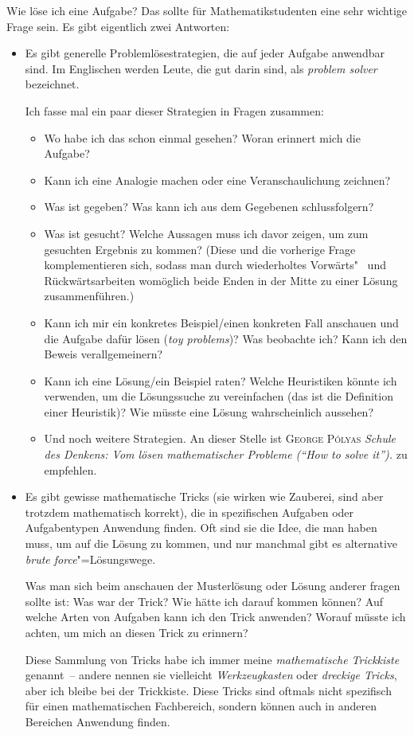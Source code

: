 \documentclass[a4paper]{article}
\begin{document}
Wie löse ich eine Aufgabe? Das sollte für Mathematikstudenten eine sehr wichtige Frage sein. Es gibt eigentlich zwei Antworten:
\begin{itemize}
    \item Es gibt generelle Problemlösestrategien, die auf jeder Aufgabe anwendbar sind. Im Englischen werden Leute, die gut darin sind, als \emph{problem solver} bezeichnet.

          Ich fasse mal ein paar dieser Strategien in Fragen zusammen:
          \begin{itemize}
              \item Wo habe ich das schon einmal gesehen? Woran erinnert mich die Aufgabe?
              \item Kann ich eine Analogie machen oder eine Veranschaulichung zeichnen?
              \item Was ist gegeben? Was kann ich aus dem Gegebenen schlussfolgern?
              \item Was ist gesucht? Welche Aussagen muss ich davor zeigen, um zum gesuchten Ergebnis zu kommen? (Diese und die vorherige Frage komplementieren sich, sodass man durch wiederholtes Vorwärts"~ und Rückwärtsarbeiten womöglich beide Enden in der Mitte zu einer Lösung zusammenführen.)
              \item Kann ich mir ein konkretes Beispiel/einen konkreten Fall anschauen und die Aufgabe dafür lösen (\emph{toy problems})? Was beobachte ich? Kann ich den Beweis verallgemeinern?
              \item Kann ich eine Lösung/ein Beispiel raten? Welche Heuristiken könnte ich verwenden, um die Lösungssuche zu vereinfachen (das ist die Definition einer Heuristik)? Wie müsste eine Lösung wahrscheinlich aussehen?
              \item Und noch weitere Strategien. An dieser Stelle ist \textsc{George Pólyas} \emph{Schule des Denkens: Vom lösen mathematischer Probleme ("`How to solve it"').} zu empfehlen.
          \end{itemize}

    \item Es gibt gewisse mathematische Tricks (sie wirken wie Zauberei, sind aber trotzdem mathematisch korrekt), die in spezifischen Aufgaben oder Aufgabentypen Anwendung finden. Oft sind sie die Idee, die man haben muss, um auf die Lösung zu kommen, und nur manchmal gibt es alternative \emph{brute force}"=Lösungswege.

          Was man sich beim anschauen der Musterlösung oder Lösung anderer fragen sollte ist: Was war der Trick? Wie hätte ich darauf kommen können? Auf welche Arten von Aufgaben kann ich den Trick anwenden? Worauf müsste ich achten, um mich an diesen Trick zu erinnern?

          Diese Sammlung von Tricks habe ich immer meine \emph{mathematische Trickkiste} genannt~-- andere nennen sie vielleicht \emph{Werkzeugkasten} oder \emph{dreckige Tricks}, aber ich bleibe bei der Trickkiste. Diese Tricks sind oftmals nicht spezifisch für einen mathematischen Fachbereich, sondern können auch in anderen Bereichen Anwendung finden.
\end{itemize}
\end{document}
